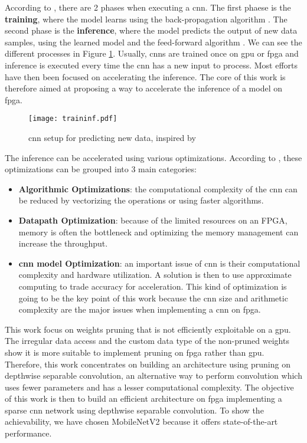 According to \textcite{abdelouahab_accelerating_2018}, there are 2 phases when executing a \acrshort{cnn}. The first phaese is the \textbf{training}, where the model learns using the back-propagation algorithm \cite{lecun_backpropagation_1989}. The second phase is the \textbf{inference}, where the model predicts the output of new data samples, using the learned model and the feed-forward algorithm \cite{zhang_optimizing_2015}. We can see the different processes in Figure \ref{fig:traininf}. Usually, \acrshort{cnn}s are trained once on \acrshort{gpu} or \acrshort{fpga} and inference is executed every time the \acrshort{cnn} has a new input to process. Most efforts have then been focused on accelerating the inference. The core of this work is therefore aimed at proposing a way to accelerate the inference of a model on \acrshort{fpga}.
%
\begin{figure}[H]
    \texttt{[image: traininf.pdf]}
    \caption{\acrshort{cnn} setup for predicting new data, inspired by \cite{nurvitadhi_can_2017}}
    \label{fig:traininf}
\end{figure}

The inference can be accelerated using various optimizations. According to \textcite{abdelouahab_accelerating_2018}, these optimizations can be grouped into 3 main categories:
\begin{itemize}
    \item \textbf{Algorithmic Optimizations}: the computational complexity of the \acrshort{cnn} can be reduced by vectorizing the operations or using faster algorithms.
    \item \textbf{Datapath Optimization}: because of the limited resources on an FPGA, memory is often the bottleneck and optimizing the memory management can increase the throughput.
    \item \textbf{\acrshort{cnn} model Optimization}: an important issue of \acrshort{cnn} is their computational complexity and hardware utilization. A solution is then to use approximate computing to trade accuracy for acceleration. This kind of optimization is going to be the key point of this work because the \acrshort{cnn} size and arithmetic complexity are the major issues when implementing a \acrshort{cnn} on \acrshort{fpga}.
\end{itemize}

This work focus on weights pruning that is not efficiently exploitable on a \acrshort{gpu}. The irregular data access and the custom data type of the non-pruned weights show it is more suitable to implement pruning on \acrshort{fpga} rather than \acrshort{gpu}. Therefore, this work concentrates on building an architecture using pruning on depthwise separable convolution, an alternative way to perform convolution which uses fewer parameters and has a lesser computational complexity. The objective of this work is then to build an efficient architecture on \acrshort{fpga} implementing a sparse \acrshort{cnn} network using depthwise separable convolution. To show the achievability, we have chosen MobileNetV2 because it offers state-of-the-art performance.

